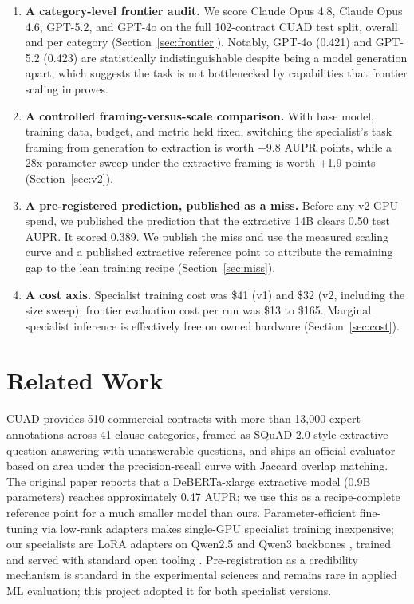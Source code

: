 \documentclass[11pt,letterpaper]{article}
\begin{document}
\begin{enumerate}
  \item \textbf{A category-level frontier audit.} We score Claude Opus 4.8,
  Claude Opus 4.6, GPT-5.2, and GPT-4o on the full 102-contract CUAD test
  split, overall and per category (Section~\ref{sec:frontier}). Notably,
  GPT-4o (0.421) and GPT-5.2 (0.423) are statistically indistinguishable
  despite being a model generation apart, which suggests the task is not
  bottlenecked by capabilities that frontier scaling improves.
  \item \textbf{A controlled framing-versus-scale comparison.} With base
  model, training data, budget, and metric held fixed, switching the
  specialist's task framing from generation to extraction is worth +9.8 AUPR
  points, while a 28x parameter sweep under the extractive framing is worth
  +1.9 points (Section~\ref{sec:v2}).
  \item \textbf{A pre-registered prediction, published as a miss.} Before any
  v2 GPU spend, we published the prediction that the extractive 14B clears
  0.50 test AUPR. It scored 0.389. We publish the miss and use the measured
  scaling curve and a published extractive reference point to attribute the
  remaining gap to the lean training recipe (Section~\ref{sec:miss}).
  \item \textbf{A cost axis.} Specialist training cost was \$41 (v1) and \$32
  (v2, including the size sweep); frontier evaluation cost per run was \$13
  to \$165. Marginal specialist inference is effectively free on owned
  hardware (Section~\ref{sec:cost}).
\end{enumerate}

\section{Related Work}

CUAD \citep{hendrycks2021cuad} provides 510 commercial contracts with more
than 13{,}000 expert annotations across 41 clause categories, framed as
SQuAD-2.0-style extractive question answering \citep{rajpurkar2018squad2}
with unanswerable questions, and ships an official evaluator based on area
under the precision-recall curve with Jaccard overlap matching. The original
paper reports that a DeBERTa-xlarge extractive model
\citep{he2021deberta} (0.9B parameters) reaches approximately 0.47 AUPR; we
use this as a recipe-complete reference point for a much smaller model than
ours. Parameter-efficient fine-tuning via low-rank adapters
\citep{hu2022lora} makes single-GPU specialist training inexpensive; our
specialists are LoRA adapters on Qwen2.5 and Qwen3 backbones
\citep{qwen25,qwen3}, trained and served with standard open tooling
\citep{wolf2020transformers}. Pre-registration as a credibility mechanism is
standard in the experimental sciences \citep{nosek2018preregistration} and
remains rare in applied ML evaluation; this project adopted it for both
specialist versions.
\end{document}
